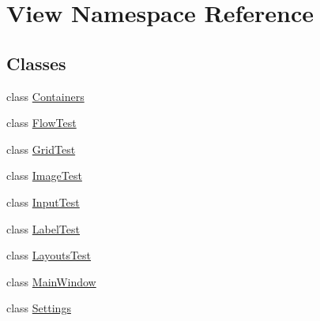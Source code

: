 \hypertarget{namespace_view}{}\section{View Namespace Reference}
\label{namespace_view}
\subsection*{Classes}
\begin{DoxyCompactItemize}
\item 
class \mbox{\hyperlink{class_view_1_1_containers}{Containers}}
\item 
class \mbox{\hyperlink{class_view_1_1_flow_test}{Flow\+Test}}
\item 
class \mbox{\hyperlink{class_view_1_1_grid_test}{Grid\+Test}}
\item 
class \mbox{\hyperlink{class_view_1_1_image_test}{Image\+Test}}
\item 
class \mbox{\hyperlink{class_view_1_1_input_test}{Input\+Test}}
\item 
class \mbox{\hyperlink{class_view_1_1_label_test}{Label\+Test}}
\item 
class \mbox{\hyperlink{class_view_1_1_layouts_test}{Layouts\+Test}}
\item 
class \mbox{\hyperlink{class_view_1_1_main_window}{Main\+Window}}
\item 
class \mbox{\hyperlink{class_view_1_1_settings}{Settings}}
\end{DoxyCompactItemize}
